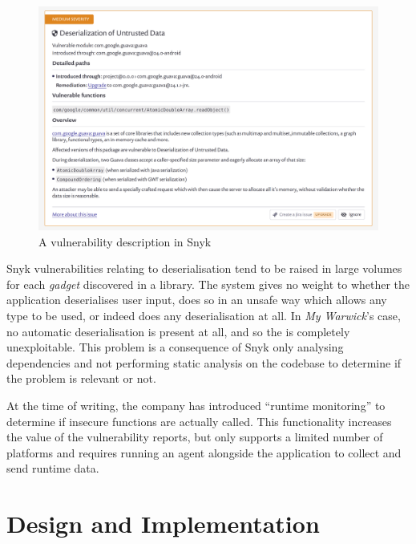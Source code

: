 \documentclass[a4paper,openany,12pt]{book}
\begin{document}
\begin{figure}
    \begin{MyMdframed}
        \vspace{0.5em}
        
        
        \caption{\label{figure:snyk}A vulnerability description in Snyk}
        \vspace{0.5em}
        \captionsetup{style=default}

        \centering \includegraphics[width=0.9\linewidth]{snyk.png}
    \end{MyMdframed}
\end{figure}

Snyk vulnerabilities relating to deserialisation tend to be raised in large volumes for each \emph{gadget} discovered in
a library.
The system gives no weight to whether the application deserialises user input, does so in an unsafe way which allows any
type to be used, or indeed does any deserialisation at all.
In \emph{My Warwick}'s case, no automatic deserialisation is present at all, and so the is completely unexploitable.
This problem is a consequence of Snyk only analysing dependencies and not performing static analysis on the codebase to
determine if the problem is relevant or not.

At the time of writing, the company has introduced ``runtime monitoring'' to determine if insecure functions are
actually called.
This functionality increases the value of the vulnerability reports, but only supports a limited number of platforms and
requires running an agent alongside the application to collect and send runtime data.

\chapter{Design and Implementation}
\end{document}
